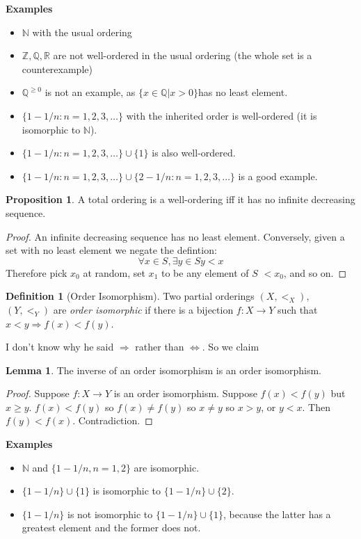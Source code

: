 \documentclass{article}
\theoremstyle{definition}
\newtheorem{definition}{Definition}
\newtheorem{proposition}{Proposition}
\newtheorem{lemma}{Lemma}
\numberwithin{definition}{section}
\begin{document}
\textbf{Examples}
\begin{itemize}
\item $\mathbb{N}$ with the usual ordering
\item $\mathbb{Z},\mathbb{Q},\mathbb{R}$ are not well-ordered in the usual ordering (the whole set is a counterexample)
\item $\mathbb{Q}^{\ge 0}$ is not an example, as $\{x \in \mathbb{Q} | x >0 \} $has no least element.
\item $\{1 - 1/n : n = 1,2,3,\ldots \}$ with the inherited order is well-ordered (it is isomorphic to $\mathbb{N}$). 
\item $\{1 - 1/n : n = 1,2,3,\ldots \}\cup \{1\}$ is also well-ordered.
\item $\{1 - 1/n : n = 1,2,3,\ldots \} \cup \{2-1/n : n=1,2,3,\ldots\}$ is a good example.
\end{itemize}

\begin{proposition} 
	A total ordering is a well-ordering iff it has no infinite decreasing sequence.
\end{proposition}
\begin{proof}
An infinite decreasing sequence has no least element. Conversely, given a set with no least element we negate the defintion:
$$\forall x \in S, \exists y \in S y <x$$
Therefore pick $x_{0}$ at random, set $x_{1}$ to be any element of $S$ $<x_{0}$, and so on. 
\end{proof}

\begin{definition}[Order Isomorphism]
Two partial orderings $(X,<_{X})$, $(Y,<_{Y})$ are \textit{order isomorphic} if there is a bijection $f: X \to Y$ such that $x <y \Rightarrow f(x) < f(y)$. 
\end{definition}
I don't know why he said $\Rightarrow$ rather than $\iff$. So we claim
\begin{lemma}
The inverse of an order isomorphism is an order isomorphism.
\end{lemma}
\begin{proof}
Suppose $f:X \to Y$ is an order isomorphism. Suppose $f(x)<f(y)$ but $x \ge y$. $f(x) < f(y)$ so $f(x) \ne f(y)$ so $x \ne y$ so $x>y$, or $y<x$. Then $f(y)<f(x)$. Contradiction.
\end{proof}

\textbf{Examples}
\begin{itemize}
\item $\mathbb{N}$ and $\{1-1/n,n = 1,2\}$ are isomorphic.
\item $\{1-1/n\}\cup \{1\}$ is isomorphic to $\{1-1/n\}\cup \{2\}$.
\item $\{1-1/n\}$ is not isomorphic to $\{1-1/n\} \cup \{1\}$, because the latter has a greatest element and the former does not.
\end{itemize}
\end{document}
